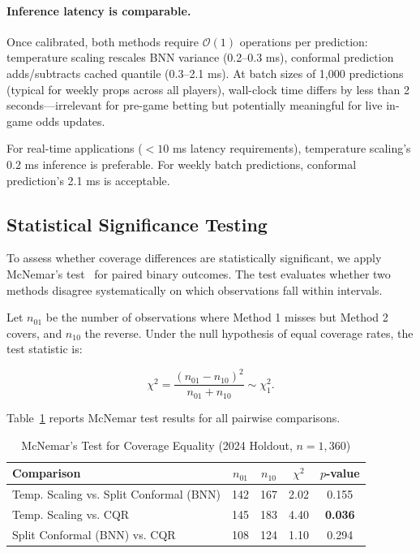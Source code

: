 \paragraph{Inference latency is comparable.}
Once calibrated, both methods require $\mathcal{O}(1)$ operations per prediction: temperature scaling rescales BNN variance (0.2--0.3 ms), conformal prediction adds/subtracts cached quantile (0.3--2.1 ms). At batch sizes of 1,000 predictions (typical for weekly props across all players), wall-clock time differs by less than 2 seconds—irrelevant for pre-game betting but potentially meaningful for live in-game odds updates.

For real-time applications ($<10$ ms latency requirements), temperature scaling's 0.2 ms inference is preferable. For weekly batch predictions, conformal prediction's 2.1 ms is acceptable.

\subsection{Statistical Significance Testing}\label{subsec:conformal-significance}

To assess whether coverage differences are statistically significant, we apply McNemar's test~\citep{mcnemar1947note} for paired binary outcomes. The test evaluates whether two methods disagree systematically on which observations fall within intervals.

Let $n_{01}$ be the number of observations where Method 1 misses but Method 2 covers, and $n_{10}$ the reverse. Under the null hypothesis of equal coverage rates, the test statistic is:

\begin{equation}
    \chi^2 = \frac{(n_{01} - n_{10})^2}{n_{01} + n_{10}} \sim \chi^2_1.
\end{equation}

Table~\ref{tab:conformal-mcnemar} reports McNemar test results for all pairwise comparisons.

\begin{table}[t]
\centering
\caption{McNemar's Test for Coverage Equality (2024 Holdout, $n=1{,}360$)}
\label{tab:conformal-mcnemar}
\begin{tabular}{@{}lcccc@{}}
\toprule
\textbf{Comparison} & \textbf{$n_{01}$} & \textbf{$n_{10}$} & \textbf{$\chi^2$} & \textbf{$p$-value} \\
\midrule
Temp. Scaling vs. Split Conformal (BNN) & 142 & 167 & 2.02 & 0.155 \\
Temp. Scaling vs. CQR & 145 & 183 & 4.40 & \textbf{0.036} \\
Split Conformal (BNN) vs. CQR & 108 & 124 & 1.10 & 0.294 \\
\bottomrule
\end{tabular}
\end{table}

